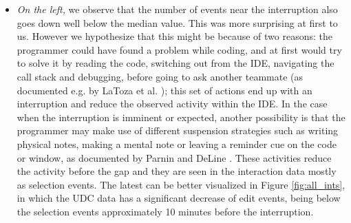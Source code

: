 \documentclass[times]{smrauth}
\begin{document}
\begin{itemize}
\item \textit{On the left,} we observe that the number of events near the interruption also goes down well below the median value. This was more surprising at first to us. However we hypothesize that this might be because of two reasons: the programmer could have found a problem while coding, and at first would try to solve it by reading the code, switching out from the IDE, navigating the call stack and debugging, before going to ask another teammate (as documented e.g. by LaToza et al. \cite{LVD06}); this set of actions end up with an interruption and reduce the observed activity within the IDE. In the case when the interruption is imminent or expected, another possibility is that the programmer may make use of different suspension strategies such as writing physical notes, making a mental note or leaving a reminder cue on the code or window, as documented by Parnin and DeLine \cite{PD10}. These activities reduce the activity before the gap and they are seen in the interaction data mostly as selection events. The latest can be better visualized in Figure \ref{fig:all_ints}, in which the UDC data has a significant decrease of edit events, being below the selection events approximately 10 minutes before the interruption.

\end{itemize}
\end{document}
